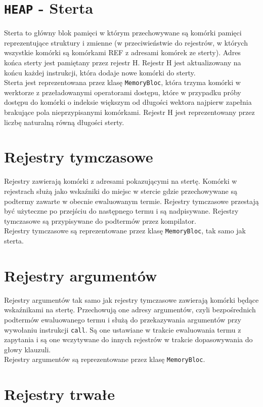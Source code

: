 \section{\texttt{HEAP} - Sterta}

Sterta to główny blok pamięci w którym przechowywane są komórki pamięci reprezentujące struktury i zmienne (w przeciwieństwie do rejestrów, w których wszystkie komórki są komórkami REF z adresami komórek ze sterty). Adres końca sterty jest pamiętany przez rejestr H. Rejestr H jest aktualizowany na końcu każdej instrukcji, która dodaje nowe komórki do sterty.\\
Sterta jest reprezentowana przez klasę \texttt{MemoryBloc}, która trzyma komórki w werktorze z przeładowanymi operatorami dostępu, które w przypadku próby dostępu do komórki o indeksie większym od długości wektora najpierw zapełnia brakujące pola nieprzypisanymi komórkami. Rejestr H jest reprezentowany przez liczbę naturalną równą długości sterty.

\section{Rejestry tymczasowe}

Rejestry zawierają komórki z adresami pokazującymi na stertę. Komórki w rejestrach służą jako wskaźniki do miejsc w stercie gdzie przechowywane są podtermy zawarte w obecnie ewaluowanym termie. Rejestry tymczasowe przestają być użyteczne po przejściu do następnego termu i są nadpisywane. Rejestry tymczasowe są przypisywane do podtermów przez kompilator.\\
Rejestry tymczasowe są reprezentowane przez klasę \texttt{MemoryBloc}, tak samo jak sterta.

\section{Rejestry argumentów}

Rejestry argumentów tak samo jak rejestry tymczasowe zawierają komórki będące wskaźnikami na stertę. Przechowują one adresy argumentów, czyli bezpośrednich podtermów ewaluowanego termu i służą do przekazywania argumentów przy wywołaniu instrukcji \texttt{call}. Są one ustawiane w trakcie ewaluowania termu z zapytania i są one wczytywane do innych rejestrów w trakcie dopasowywania do głowy klauzuli.\\
Rejestry argumentów są reprezentowane przez klasę \texttt{MemoryBloc}.

\section{Rejestry trwałe}

